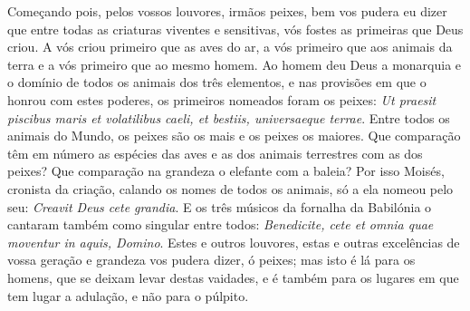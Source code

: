 Começando pois, pelos vossos louvores, irmãos peixes, bem vos pudera eu
dizer que entre todas as criaturas viventes e sensitivas, vós fostes as
primeiras que Deus criou. A vós criou primeiro que as aves do ar, a vós
primeiro que aos animais da terra e a vós primeiro que ao mesmo homem.
Ao homem deu Deus a monarquia e o domínio de todos os animais dos três
elementos, e nas provisões em que o honrou com estes poderes, os
primeiros nomeados foram os peixes: \emph{Ut praesit piscibus maris et
volatilibus caeli, et bestiis, universaeque terrae}. Entre todos os
animais do Mundo, os peixes são os mais e os peixes os maiores. Que
comparação têm em número as espécies das aves e as dos animais
terrestres com as dos peixes? Que comparação na grandeza o elefante com
a baleia? Por isso Moisés, cronista da criação, calando os nomes de
todos os animais, só a ela nomeou pelo seu: \emph{Creavit Deus cete
grandia}. E os três músicos da fornalha da Babilónia o cantaram também
como singular entre todos: \emph{Benedicite, cete et omnia quae moventur
in aquis, Domino}. Estes e outros louvores, estas e outras excelências
de vossa geração e grandeza vos pudera dizer, ó peixes; mas isto é lá
para os homens, que se deixam levar destas vaidades, e é também para os
lugares em que tem lugar a adulação, e não para o púlpito.

